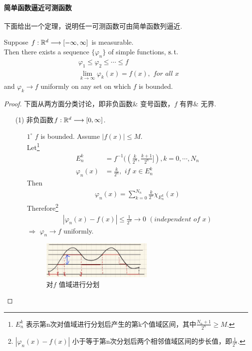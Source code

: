 \paragraph{简单函数逼近可测函数}
	下面给出一个定理，说明任一可测函数可由简单函数列逼近.
	\begin{thm}\label{thm 2.2.1}
		Suppose $f : \mathbb{R}^d \longrightarrow [-\infty , \infty]$ is measurable. \\
		Then there exists a sequence $\{ \varphi_n \}$ of simple functions, $\operatorname{s.t.}$
		\begin{align}
			&\varphi_1 \leq \varphi_2 \leq \cdots \leq f \\
			&\lim_{k \to \infty}{\varphi_{k}(x)} = f(x) , \,\, for \,\, all \,\, x
		\end{align}
		and $\varphi_k \to f$ uniformly on any set on which $f$ is bounded.
		
		\vspace{2em}
		\begin{proof}
			下面从两方面分类讨论，即非负函数$\&$ 变号函数，$f$ 有界$\&$ 无界.
			\begin{enumerate}
				\item[(1)]非负函数$f : \mathbb{R}^d \longrightarrow [0 , \infty]$.
				\begin{enumerate}
					\item[$1^{\circ}$]$f$ is bounded. Assume $\left| f(x) \right| \leq M$.\\
					Let\footnote{$E_{n}^k$ 表示第n次对值域进行分划后产生的第k个值域区间，其中$\frac{N_n + 1}{2^n} \geq M$.}
					\begin{align}
						E_{n}^{k} &= f^{-1}((\frac{k}{2^n} , \frac{k + 1}{2^n}]) , k = 0 , \cdots , N_n \\
						\varphi_{n}(x) &= \frac{k}{2^n} , \,\, if \,\, x \in E_{n}^{k}
					\end{align}
					Then
					\begin{align}
						\varphi_{n}(x) = \sum_{k = 0}^{N_n}{\frac{k}{2^n} \chi_{E_{n}^{k}}(x)}
					\end{align}
					Therefore\footnote{$\left| \varphi_{n}(x) - f(x) \right|$ 小于等于第n次分划后两个相邻值域区间的步长值，即$\frac{1}{2^n}$.}
					\begin{align}
						\left| \varphi_{n}(x) - f(x) \right| \leq \frac{1}{2^n} \to 0 \,\, (independent \,\, of \,\, x)
					\end{align}
					$\Rightarrow$ $\varphi_{n} \to f$ uniformly.
					
					\begin{figure}[htbp]  %
						\centering  %
						\includegraphics[width=0.55\textwidth]{figure/2.2-1} %
						\caption{对$f$ 值域进行分划} %
						\label{pic 2.1}
					\end{figure}
				

\end{enumerate}
\end{enumerate}
\end{proof}
\end{thm}
